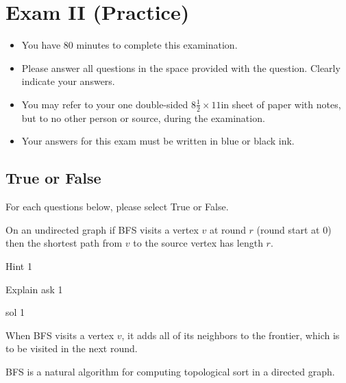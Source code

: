 \chapter{Exam II (Practice)}
\label{ch:examii-practice}

\begin{preamble}
\begin{itemize}
\item You have 80 minutes to complete this examination.
\item Please answer all questions in the space provided with the
  question.  Clearly indicate your answers.
\item You may refer to your one double-sided $8\frac{1}{2} \times 11$in
  sheet of paper with notes, but to no other person or source, during the
  examination.

\item Your answers for this exam must be written in blue or black ink.

\end{itemize}
\end{preamble}


\section{True or False}

\begin{problem}[14.][BFS]
For each questions below, please select True or False.

\asktf[2.0]

On an undirected graph if  BFS visits a vertex $v$ at round $r$ (round
start at $0$) then the shortest path from $v$ to the source vertex has
length $r$.

\hint
Hint 1

\explain 
Explain  ask 1

\solt

\explain  sol 1

\asktf

When BFS visits a vertex $v$, it adds all of its neighbors to the
frontier, which is to be visited in the next round.

\solf

\asktf

BFS is a natural algorithm for computing topological sort in a directed graph.

\solf

\end{problem}

